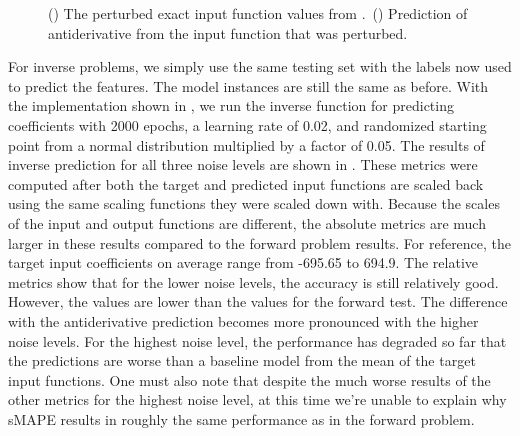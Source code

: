 \begin{figure}[H]
  \centering
  \begin{subfigure}{\linewidth}
    \begin{adjustbox}{width=\linewidth}
      
    \end{adjustbox}
    \caption{}\label{fig:antiderivative_exact_input}
  \end{subfigure}
  \begin{subfigure}{\linewidth}
    \begin{adjustbox}{width=\linewidth}
      
    \end{adjustbox}
    \caption{}\label{fig:antiderivative_exact_prediction}
  \end{subfigure}
  \caption{() The perturbed exact input function values from .\ () Prediction of antiderivative from the input function that was perturbed.}\label{fig:antiderivative_exact}
\end{figure}

For inverse problems, we simply use the same testing set with the labels now used to predict the features. The model instances are still the same as before. With the implementation shown in , we run the inverse function for predicting coefficients with 2000 epochs, a learning rate of 0.02, and randomized starting point from a normal distribution multiplied by a factor of 0.05. The results of inverse prediction for all three noise levels are shown in . These metrics were computed after both the target and predicted input functions are scaled back using the same scaling functions they were scaled down with. Because the scales of the input and output functions are different, the absolute metrics are much larger in these results compared to the forward problem results. For reference, the target input coefficients on average range from -695.65 to 694.9. The relative metrics show that for the lower noise levels, the accuracy is still relatively good. However, the values are lower than the values for the forward test. The difference with the antiderivative prediction becomes more pronounced with the higher noise levels. For the highest noise level, the performance has degraded so far that the predictions are worse than a baseline model from the mean of the target input functions. One must also note that despite the much worse results of the other metrics for the highest noise level, at this time we're unable to explain why sMAPE results in roughly the same performance as in the forward problem.

